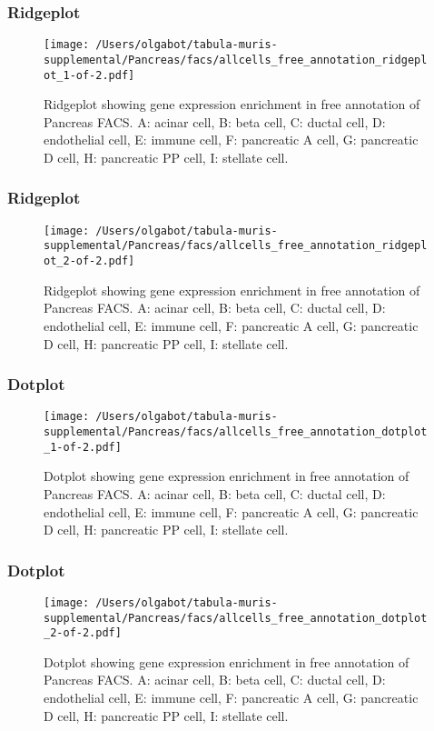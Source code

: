 \clearpage
\clearpage
\subsubsection{Ridgeplot}
\begin{figure}[h]
\centering
\texttt{[image: /Users/olgabot/tabula-muris-supplemental/Pancreas/facs/allcells\_free\_annotation\_ridgeplot\_1-of-2.pdf]}

\caption{ Ridgeplot  showing gene expression enrichment in free annotation of Pancreas FACS. A: acinar cell, B: beta cell, C: ductal cell, D: endothelial cell, E: immune cell, F: pancreatic A cell, G: pancreatic D cell, H: pancreatic PP cell, I: stellate cell.}
\end{figure}


\clearpage
\clearpage
\subsubsection{Ridgeplot}
\begin{figure}[h]
\centering
\texttt{[image: /Users/olgabot/tabula-muris-supplemental/Pancreas/facs/allcells\_free\_annotation\_ridgeplot\_2-of-2.pdf]}

\caption{ Ridgeplot  showing gene expression enrichment in free annotation of Pancreas FACS. A: acinar cell, B: beta cell, C: ductal cell, D: endothelial cell, E: immune cell, F: pancreatic A cell, G: pancreatic D cell, H: pancreatic PP cell, I: stellate cell.}
\end{figure}


\clearpage
\clearpage
\subsubsection{Dotplot}
\begin{figure}[h]
\centering
\texttt{[image: /Users/olgabot/tabula-muris-supplemental/Pancreas/facs/allcells\_free\_annotation\_dotplot\_1-of-2.pdf]}

\caption{ Dotplot  showing gene expression enrichment in free annotation of Pancreas FACS. A: acinar cell, B: beta cell, C: ductal cell, D: endothelial cell, E: immune cell, F: pancreatic A cell, G: pancreatic D cell, H: pancreatic PP cell, I: stellate cell.}
\end{figure}


\clearpage
\clearpage
\subsubsection{Dotplot}
\begin{figure}[h]
\centering
\texttt{[image: /Users/olgabot/tabula-muris-supplemental/Pancreas/facs/allcells\_free\_annotation\_dotplot\_2-of-2.pdf]}

\caption{ Dotplot  showing gene expression enrichment in free annotation of Pancreas FACS. A: acinar cell, B: beta cell, C: ductal cell, D: endothelial cell, E: immune cell, F: pancreatic A cell, G: pancreatic D cell, H: pancreatic PP cell, I: stellate cell.}
\end{figure}


